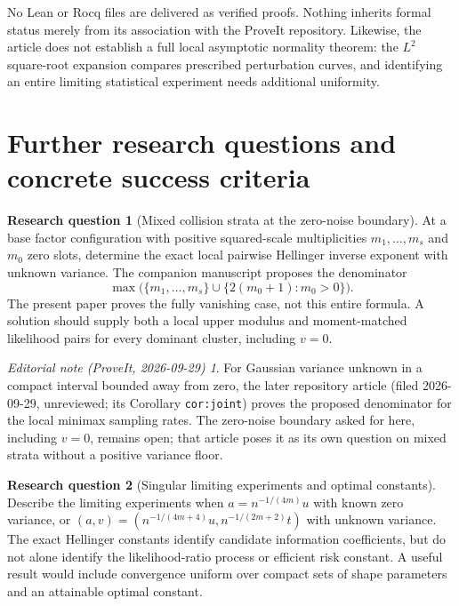 \documentclass[11pt,a4paper]{article}
\numberwithin{equation}{section}
\theoremstyle{definition}
\newtheorem{question}{Research question}
\theoremstyle{remark}
\newtheorem*{ednote}{Editorial note (ProveIt, 2026-09-29)}
\begin{document}
No Lean or Rocq files are delivered as verified proofs. Nothing inherits
formal status merely from its association with the ProveIt repository.
Likewise, the article does not establish a full local asymptotic normality
theorem: the $L^2$ square-root expansion compares prescribed perturbation
curves, and identifying an entire limiting statistical experiment needs
additional uniformity.

\section{Further research questions and concrete success criteria}
\label{sec:questions}

\begin{question}[Mixed collision strata at the zero-noise boundary]
At a base factor configuration with positive squared-scale multiplicities
$m_1,\ldots,m_s$ and $m_0$ zero slots, determine the exact local pairwise
Hellinger inverse exponent with unknown variance. The companion manuscript
proposes the denominator
\[
 \max\bigl(\{m_1,\ldots,m_s\}\cup
 \{2(m_0+1):m_0>0\}\bigr).
\]
The present paper proves the fully vanishing case, not this entire formula.
A solution should supply both a local upper modulus and moment-matched
likelihood pairs for every dominant cluster, including $v=0$.
\end{question}
\begin{ednote}
For Gaussian variance unknown in a compact interval bounded away from zero,
the later repository article  (filed 2026-09-29, unreviewed;
its Corollary \texttt{cor:joint}) proves the proposed denominator for the
local minimax sampling rates. The zero-noise boundary asked for here,
including $v=0$, remains open; that article poses it as its own question on
mixed strata without a positive variance floor.
\end{ednote}

\begin{question}[Singular limiting experiments and optimal constants]
Describe the limiting experiments when
$a=n^{-1/(4m)}u$ with known zero variance, or
$(a,v)=(n^{-1/(4m+4)}u,n^{-1/(2m+2)}t)$ with unknown variance.
The exact Hellinger constants identify candidate information coefficients,
but do not alone identify the likelihood-ratio process or efficient risk
constant. A useful result would include convergence uniform over compact
sets of shape parameters and an attainable optimal constant.
\end{question}
\end{document}
